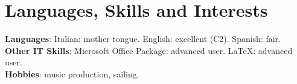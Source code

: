 \documentclass[letterpaper,11pt]{article}
\newcommand{\resumeItem}[1]{
  \item\small{
    {#1 \vspace{-2pt}}
  }
}
\newcommand{\resumeSubItem}[1]{\resumeItem{#1}\vspace{-4pt}}
\newcommand{\resumeSubHeadingListStart}{\begin{itemize}[leftmargin=0.15in, label={}]}
\newcommand{\resumeSubHeadingListEnd}{\end{itemize}}
\begin{document}
%
\section{Languages, Skills and Interests}
\begin{itemize}[leftmargin=0.15in, label={}]
  \small{\item{
                \textbf{Languages}{: Italian: mother tongue. English: excellent (C2). Spanish: fair.} \\
                \textbf{Other IT Skills}{: Microsoft Office Package: advanced user. \LaTeX: advanced user. } \\
                \textbf{Hobbies}{: music production, sailing.}
          }}
\end{itemize}




\end{document}
